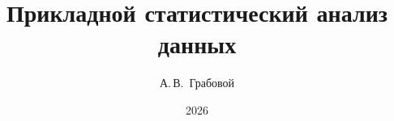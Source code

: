 \documentclass[11pt,a5paper,twoside,openany]{book}
\title{Прикладной статистический анализ данных}
\author{А.\,В.~Грабовой}
\date{2026}
\begin{document}
\frontmatter



\tableofcontents

\mainmatter











\appendix


\backmatter

\nocite{*}



\end{document}
